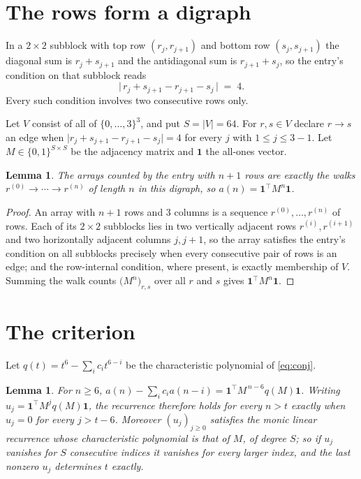 \documentclass[11pt,a4paper]{article}
\theoremstyle{plain}
\newtheorem{lemma}[theorem]{Lemma}
\theoremstyle{definition}
\begin{document}
\section{The rows form a digraph}

In a $2\times2$ subblock with top row $(r_j,r_{j+1})$ and bottom row $(s_j,s_{j+1})$ the
diagonal sum is $r_j+s_{j+1}$ and the antidiagonal sum is $r_{j+1}+s_j$, so the entry's
condition on that subblock reads
\[
\bigl|\,r_j+s_{j+1}-r_{j+1}-s_j\,\bigr|\;=\;4.
\]
Every such condition involves two consecutive rows only.

Let $V$ consist of all of $\{0,\dots,3\}^{3}$, and put $S=|V|=64$. For $r,s\in V$ declare $r\to s$ an edge
when $\bigl|r_j+s_{j+1}-r_{j+1}-s_j\bigr|=4$ for every $j$ with
$1\le j\le3-1$. Let $M\in\{0,1\}^{S\times S}$ be the adjacency matrix and $\mathbf{1}$
the all-ones vector.

\begin{lemma}\label{lem:walk}
The arrays counted by the entry with $n+1$ rows are exactly the walks
$r^{(0)}\to\cdots\to r^{(n)}$ of length $n$ in this digraph, so
$a(n)=\mathbf{1}^{\!\top}M^{n}\mathbf{1}$.
\end{lemma}

\begin{proof}
An array with $n+1$ rows and $3$ columns is a sequence $r^{(0)},\dots,r^{(n)}$ of
rows. Each of its $2\times2$ subblocks lies in two vertically adjacent rows
$r^{(i)},r^{(i+1)}$ and two horizontally adjacent columns $j,j+1$, so the array satisfies
the entry's condition on all subblocks precisely when every consecutive pair of rows is an
edge; and the row-internal condition, where present, is exactly membership of $V$. Summing
the walk counts $\bigl(M^{n}\bigr)_{r,s}$ over all $r$ and $s$ gives
$\mathbf{1}^{\!\top}M^{n}\mathbf{1}$.
\end{proof}

\section{The criterion}

Let $q(t)=t^{6}-\sum_i c_i t^{6-i}$ be the characteristic polynomial of
\eqref{eq:conj}.

\begin{lemma}\label{lem:crit}
For $n\ge6$,
$a(n)-\sum_i c_i a(n-i)=\mathbf{1}^{\!\top}M^{\,n-6}q(M)\mathbf{1}$. Writing
$u_j=\mathbf{1}^{\!\top}M^{j}q(M)\mathbf{1}$, the recurrence therefore holds for every
$n>t$ exactly when $u_j=0$ for every $j>t-6$. Moreover $(u_j)_{j\ge0}$ satisfies the
monic linear recurrence whose characteristic polynomial is that of $M$, of degree $S$; so
if $u_j$ vanishes for $S$ consecutive indices it vanishes for every larger index, and the
last nonzero $u_j$ determines $t$ exactly.
\end{lemma}
\end{document}

